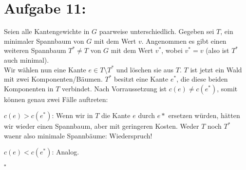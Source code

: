\documentclass[11pt]{scrartcl} %
\begin{document}
\newpage
\section*{Aufgabe 11:}
\begin{compactenum}[(a)]
    \item Seien alle Kantengewichte in $G$ paarweise unterschiedlich. Gegeben sei $T$, ein minimaler Spannbaum von $G$ mit dem Wert $v$. Angenommen es gibt einen weiteren Spannbaum $T^* \ne T$ von $G$ mit dem Wert $v^*$, wobei $v^* = v$ (also ist $T^*$ auch minimal).\\
    Wir wählen nun eine Kante $e \in T \setminus T^*$ und löschen sie aus $T$. $T$ ist jetzt ein Wald mit zwei Komponenten/Bäumen. $T^*$ besitzt eine Kante $e^*$, die diese beiden Komponenten in $T$ verbindet. Nach Vorraussetzung ist $c(e) \ne c(e^*)$, somit können genau zwei Fälle auftreten:\\

    \begin{compactenum}[1.]
        \item $c(e) > c(e^*)$: Wenn wir in $T$ die Kante $e$ durch $e*$ ersetzen würden, hätten wir wieder einen Spannbaum, aber mit geringeren Kosten. Weder $T$ noch $T^*$ waenr also minimale Spannbäume: Wiederspruch!
        \item $c(e) < c(e^*)$: Analog.
    \end{compactenum}
    \hfill $\square$

\end{compactenum}
\end{document}
